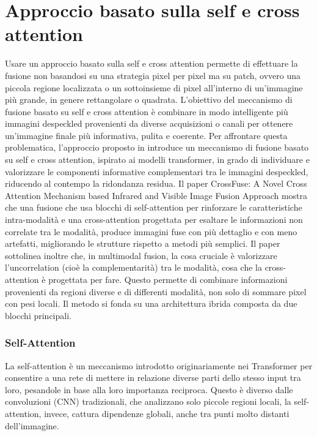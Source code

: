 

\chapter{Approccio basato sulla self e cross attention}
Usare un approccio basato sulla self e cross attention permette di effettuare la fusione non basandosi su una strategia 
pixel per pixel ma su patch, ovvero 
una piccola regione localizzata o un sottoinsieme di pixel all'interno di 
un'immagine più grande, in genere rettangolare o quadrata.
L’obiettivo del meccanismo di fusione basato su self e cross attention è combinare 
in modo intelligente più immagini despeckled provenienti da diverse acquisizioni o canali per ottenere un’immagine finale più informativa, pulita e coerente. 
Per affrontare questa problematica, l’approccio proposto in \cite{li2024crossfuse} introduce un meccanismo di fusione basato su self e cross attention, ispirato ai modelli 
transformer, in grado di individuare e valorizzare le componenti informative complementari tra le immagini despeckled, riducendo al contempo la ridondanza residua.
Il paper CrossFuse: A Novel Cross Attention Mechanism based Infrared and Visible Image Fusion Approach mostra che una 
fusione che usa blocchi di self-attention per rinforzare le caratteristiche intra-modalità  
e una cross-attention progettata per esaltare le informazioni non correlate tra le modalità, produce immagini 
fuse con più dettaglio e con meno artefatti, migliorando le strutture rispetto a metodi più semplici. 
Il paper sottolinea inoltre che, in multimodal fusion, la cosa cruciale è valorizzare l’uncorrelation (cioè la complementarità) tra le modalità, 
cosa che la cross-attention è progettata per fare. Questo permette di combinare 
informazioni provenienti da regioni diverse e di differenti modalità, non solo di sommare pixel con pesi locali. 
Il metodo si fonda su una architettura ibrida composta da due blocchi principali.
\subsection{Self-Attention}
La self-attention è un meccanismo introdotto originariamente nei Transformer per consentire a 
una rete di mettere in relazione diverse parti dello stesso input tra loro, pesandole in base alla loro importanza reciproca.
Questo è diverso dalle convoluzioni (CNN) tradizionali, che analizzano solo piccole regioni locali, la self-attention, invece, 
cattura dipendenze globali, anche tra punti molto distanti dell’immagine.
